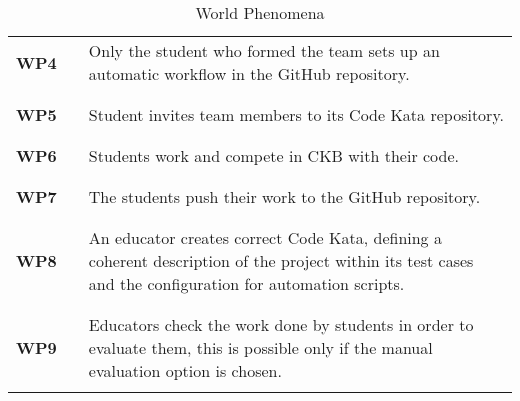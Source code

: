 \begin{table}[H]
\begin{tabular}{l l p{12cm}}
        \textbf{WP4} & \vline & Only the student who formed the team sets up an automatic workflow in the GitHub repository.                                                              \\
                     &        &                                                                                                                                                           \\\hline & & \\
        \textbf{WP5} & \vline & Student invites team members to its Code Kata repository.                                                                                                 \\
                     &        &                                                                                                                                                           \\\hline & & \\
        \textbf{WP6} & \vline & Students work and compete in CKB with their code.                                                                                                         \\
                     &        &                                                                                                                                                           \\\hline & & \\
        \textbf{WP7} & \vline & The students push their work to the GitHub repository.                                                                                                    \\
                     &        &                                                                                                                                                           \\\hline & & \\
        \textbf{WP8} & \vline & An educator creates correct Code Kata, defining a coherent description of the project within its test cases and the configuration for automation scripts. \\
                     &        &                                                                                                                                                           \\\hline & & \\
        \textbf{WP9} & \vline & Educators check the work done by students in order to evaluate them, this is possible only if the manual evaluation option is chosen.                     \\
                     &        &                                                                                                                                                           \\
        \hline
    \end{tabular}
    \caption{World Phenomena}
\end{table}

